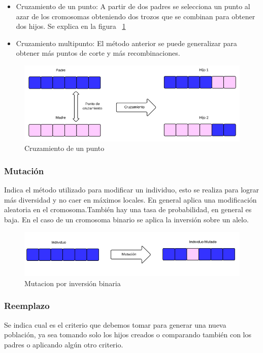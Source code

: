 \begin{itemize}
	\item Cruzamiento de un punto: A partir de dos padres se selecciona un punto al azar de los cromosomas obteniendo dos trozos que se combinan para obtener dos hijos. Se explica en la figura ~\ref{fig:cruzamiento1}
	\item Cruzamiento multipunto: El método anterior se puede generalizar para obtener más puntos de corte y más recombinaciones.
\end{itemize}

\begin{figure}[h]
	\centering
	\includegraphics[width=\textwidth]{Figures/cruzamiento1}
	\caption{Cruzamiento de un punto}
	\label{fig:cruzamiento1}
\end{figure}

\subsubsection{Mutación} 
Indica el método utilizado para modificar un individuo, esto se realiza para lograr más diversidad y no caer en máximos locales. En general aplica una modificación aleatoria en el cromosoma.También hay una tasa de probabilidad, en general es baja. En el caso de un cromosoma binario se aplica la inversión sobre un alelo.

\begin{figure}[h]
	\centering
	\includegraphics[width=1\linewidth]{Figures/mutacion1}
	\caption{Mutacion por inversión binaria}
	\label{fig:mutacion1}
\end{figure}


\subsubsection{Reemplazo} 
Se indica cual es el criterio que debemos tomar para generar una nueva población, ya sea tomando solo los hijos creados o comparando también con los padres o aplicando algún otro criterio.

